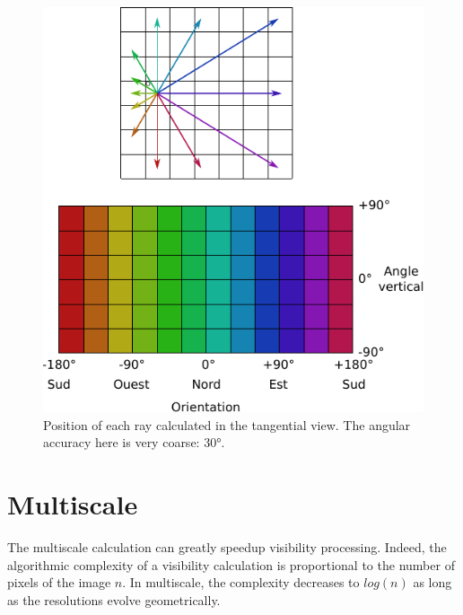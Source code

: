 \documentclass{report}
\begin{document}
\begin{figure}[H]
	\includegraphics{img/grid_tan_result.pdf} 
	\caption{Position of each ray calculated in the tangential view. The angular accuracy here is very coarse: 30°.}
	\label{grid_tan_result}
\end{figure}

\section{Multiscale}
\label{multires}
The multiscale calculation can greatly speedup visibility processing. Indeed, the algorithmic complexity of a visibility calculation is proportional to the number of pixels of the image $n$. In multiscale, the complexity decreases to $log(n)$ as long as the resolutions evolve geometrically.
\end{document}
